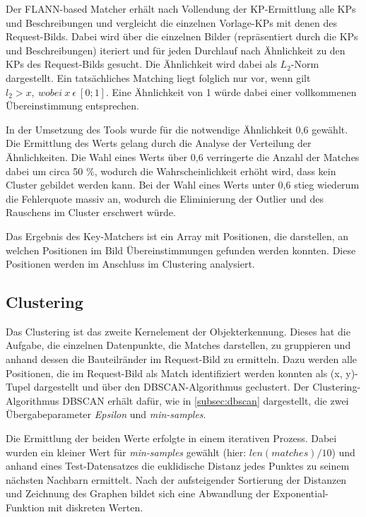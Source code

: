 \documentclass[
    type=Prakikumsbericht,
    status=draft, %
    language=german, %
    bibengine=bibtex,
]{unibwm-inf-thesis}
\begin{document}
    Der \ac{FLANN}-based Matcher erhält nach Vollendung der \ac{KP}-Ermittlung alle \acp{KP} und Beschreibungen und vergleicht die einzelnen Vorlage-\acp{KP} mit denen des Request-Bilds.
    Dabei wird über die einzelnen Bilder (repräsentiert durch die \acp{KP} und Beschreibungen) iteriert und für jeden Durchlauf nach Ähnlichkeit zu den \acp{KP} des Request-Bilds gesucht.
    Die Ähnlichkeit wird dabei als $L_{2}$-Norm dargestellt.
    Ein tatsächliches Matching liegt folglich nur vor, wenn gilt $l_{2} > x,~wobei~x~\epsilon~[0; 1]$.
    Eine Ähnlichkeit von 1 würde dabei einer vollkommenen Übereinstimmung entsprechen.

    In der Umsetzung des Tools wurde für die notwendige Ähnlichkeit 0,6 gewählt.
    Die Ermittlung des Werts gelang durch die Analyse der Verteilung der Ähnlichkeiten.
    Die Wahl eines Werts über 0,6 verringerte die Anzahl der Matches dabei um circa 50 \%, wodurch die Wahrscheinlichkeit erhöht wird, dass kein Cluster gebildet werden kann.
    Bei der Wahl eines Werts unter 0,6 stieg wiederum die Fehlerquote massiv an, wodurch die Eliminierung der Outlier und des Rauschens im Cluster erschwert würde.

    Das Ergebnis des Key-Matchers ist ein Array mit Positionen, die darstellen, an welchen Positionen im Bild Übereinstimmungen gefunden werden konnten.
    Diese Positionen werden im Anschluss im Clustering analysiert.

    \subsection{Clustering} \label{subsubsec:clustering}
    Das Clustering ist das zweite Kernelement der Objekterkennung.
    Dieses hat die Aufgabe, die einzelnen Datenpunkte, die Matches darstellen, zu gruppieren und anhand dessen die Bauteilränder im Request-Bild zu ermitteln.
    Dazu werden alle Positionen, die im Request-Bild als Match identifiziert werden konnten als (x, y)-Tupel dargestellt und über den \ac{DBSCAN}-Algorithmus geclustert.
    Der Clustering-Algorithmus \ac{DBSCAN} erhält dafür, wie in \autoref{subsec:dbscan} dargestellt, die zwei Übergabeparameter \textit{Epsilon} und \textit{min-samples}.

    Die Ermittlung der beiden Werte erfolgte in einem iterativen Prozess.
    Dabei wurden ein kleiner Wert für \textit{min-samples} gewählt (hier: $len(matches) / 10 $) und anhand eines Test-Datensatzes die euklidische Distanz jedes Punktes zu seinem nächsten Nachbarn ermittelt.
    Nach der aufsteigender Sortierung der Distanzen und Zeichnung des Graphen bildet sich eine Abwandlung der Exponential-Funktion mit diskreten Werten.
\end{document}
